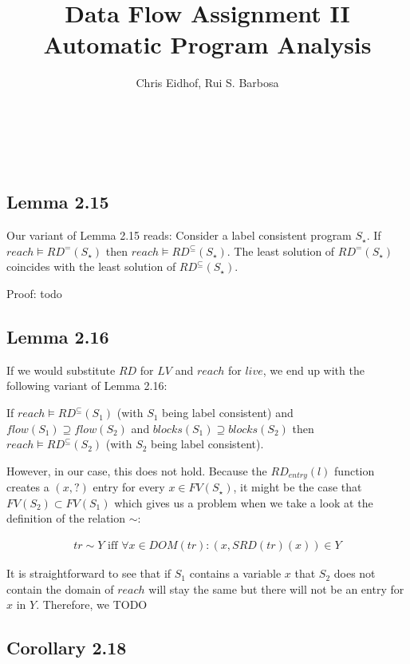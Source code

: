 \documentclass[a4wide,12pt]{article}
\theoremstyle{definition}
\theoremstyle{plain}
\theoremstyle{remark}
\def\rdsub{RD^\subseteq(S_\star)}
\begin{document}
\author{Chris Eidhof, Rui S. Barbosa}
\title{Data Flow Assignment II \\ Automatic Program Analysis}
 
\maketitle

\section{~}


\subsection{Lemma 2.15}

Our variant of Lemma 2.15 reads: Consider a label consistent program $S_\star$.
If $reach \models RD^=(S_\star)$ then $reach \models \rdsub$. The
least solution of $RD^=(S_\star)$ coincides with the least solution of $\rdsub$.

Proof: todo

\subsection{Lemma 2.16}

If we would substitute $RD$ for $LV$ and $reach$ for $live$, we end up with the
following variant of Lemma 2.16:

If $reach \models RD^\subseteq(S_1)$ (with $S_1$ being label consistent) and
$flow(S_1) \supseteq flow(S_2)$ and $blocks(S_1) \supseteq blocks(S_2)$ then
$reach \models RD^\subseteq(S_2)$ (with $S_2$ being label consistent).

However, in our case, this does not hold.  Because the $RD_{entry}(l)$ function
creates a $(x, ?)$ entry for every $x \in FV(S_\star)$, it might be the case
that $FV(S_2) \subset FV(S_1)$ which gives us a problem when we take a look at
the definition of the relation $\sim$:

\begin{align}
tr \sim Y \text{\ \ iff\ \ } \forall x \in DOM(tr): (x, SRD(tr)(x)) \in Y
\end{align}

It is straightforward to see that if $S_1$ contains a variable $x$ that $S_2$ does
not contain the domain of $reach$ will stay the same but there will not be an
entry for $x$ in $Y$. Therefore, we TODO

\subsection{Corollary 2.18}
\end{document}
